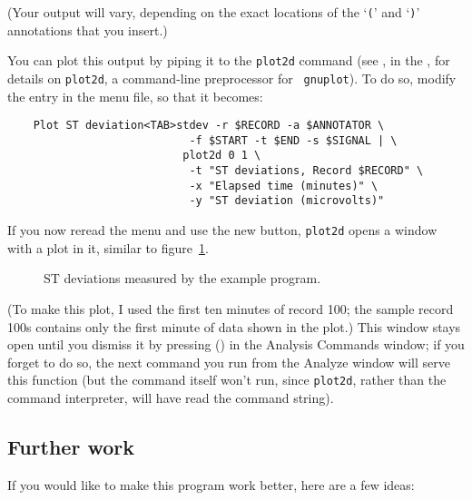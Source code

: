 \documentclass[twoside]{book}
\newcommand{\keycap}[1]{\cornersize{.5}\Ovalbox{\small\sf #1}}
\newcommand{\button}[1]{\cornersize{2}\ovalbox{\rule[-.3mm]{0cm}{2.5mm}\small\sf ~#1~}}
\begin{document}
(Your output will vary, depending on the exact locations of the
`{\tt (}' and `{\tt )}' annotations that you insert.)

You can plot this output by piping it to the {\tt plot2d} command (see
, in the
,
for details on {\tt plot2d}, a command-line preprocessor for {\tt
gnuplot}).
To do so, modify the entry in the menu file, so that it becomes:
\begin{verbatim}
    Plot ST deviation<TAB>stdev -r $RECORD -a $ANNOTATOR \
                            -f $START -t $END -s $SIGNAL | \
                           plot2d 0 1 \
                            -t "ST deviations, Record $RECORD" \
                            -x "Elapsed time (minutes)" \
                            -y "ST deviation (microvolts)"
\end{verbatim}

If you now reread the menu and use the new \button{Plot ST deviation}
button, {\tt plot2d} opens a window with a plot in it, similar to
figure~\ref{fig:stdev-plot}.
\begin{figure}
\centerline{}
\caption{ST deviations measured by the example program.}
\label{fig:stdev-plot}
\end{figure}
(To make this plot, I used the first ten minutes of record 100; the
sample record 100s contains only the first minute of data shown in the
plot.)  This window stays open until you dismiss it by pressing
\keycap{Enter} (\keycap{Return}) in the {\sf Analysis Commands}
window; if you forget to do so, the next command you run from the {\sf
Analyze} window will serve this function (but the command itself won't
run, since {\tt plot2d}, rather than the command interpreter, will
have read the command string).

\subsection*{Further work}
If you would like to make this program work better, here are a few
ideas:
\end{document}
